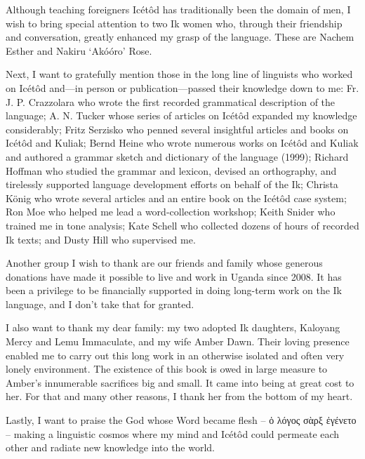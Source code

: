 Although teaching foreigners Icétôd has traditionally been the domain of men, I wish to bring special attention to two Ik women who, through their friendship and conversation, greatly enhanced my grasp of the language. These are Nachem Esther and Nakiru ‘Akóóro’ Rose.

Next, I want to gratefully mention those in the long line of linguists who worked on Icétôd and—in person or publication—passed their knowledge down to me: Fr. J. P. Crazzolara who wrote the first recorded grammatical description of the language; A. N. Tucker whose series of articles on Icétôd expanded my knowledge considerably; Fritz Serzisko who penned several insightful articles and books on Icétôd and Kuliak; Bernd Heine who wrote numerous works on Icétôd and Kuliak and authored a grammar sketch and dictionary of the language (1999); Richard Hoffman who studied the grammar and lexicon, devised an orthography, and tirelessly supported language development efforts on behalf of the Ik; Christa K\"{o}nig who wrote several articles and an entire book on the Icétôd case system; Ron Moe who helped me lead a word-collection workshop; Keith Snider who trained me in tone analysis; Kate Schell who collected dozens of hours of recorded Ik texts; and Dusty Hill who supervised me.

Another group I wish to thank are our friends and family whose generous donations have made it possible to live and work in Uganda since 2008. It has been a privilege to be financially supported in doing long-term work on the Ik language, and I don’t take that for granted. 

I also want to thank my dear family: my two adopted Ik daughters, Kaloyang Mercy and Lemu Immaculate, and my wife Amber Dawn. Their loving presence enabled me to carry out this long work in an otherwise isolated and often very lonely environment. The existence of this book is owed in large measure to Amber’s innumerable sacrifices big and small. It came into being at great cost to her. For that and many other reasons, I thank her from the bottom of my heart.

Lastly, I want to praise the God whose Word became flesh
-- ὁ λόγος σὰρξ ἐγένετο --
making a linguistic cosmos where my mind and Icétôd could permeate each other and radiate new knowledge into the world.
